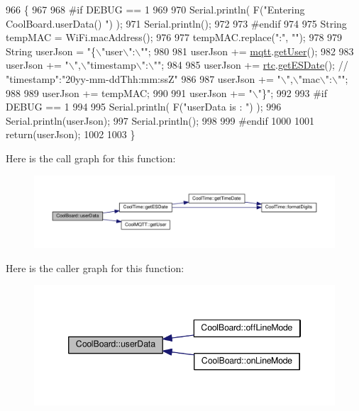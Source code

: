\begin{DoxyCode}
966 \{
967 
968 \textcolor{preprocessor}{#if DEBUG == 1}
969 
970     Serial.println( F(\textcolor{stringliteral}{"Entering CoolBoard.userData() "}) );
971     Serial.println();
972 
973 \textcolor{preprocessor}{#endif}
974 
975     String tempMAC = WiFi.macAddress();
976 
977     tempMAC.replace(\textcolor{stringliteral}{":"}, \textcolor{stringliteral}{""});
978 
979     String userJson = \textcolor{stringliteral}{"\{\(\backslash\)"user\(\backslash\)":\(\backslash\)""};
980 
981     userJson += \hyperlink{classCoolBoard_a2399f44d7c23c1149a335cb3b46d90f1}{mqtt}.\hyperlink{classCoolMQTT_a373cc92fca7760d886f02d8a6e5b3f63}{getUser}();
982 
983     userJson += \textcolor{stringliteral}{"\(\backslash\)",\(\backslash\)"timestamp\(\backslash\)":\(\backslash\)""};
984 
985     userJson += \hyperlink{classCoolBoard_a50d2a6716879d64a85f3c6b44ad63275}{rtc}.\hyperlink{classCoolTime_ac4f32ee513c1328d984306645e8785a4}{getESDate}(); \textcolor{comment}{// "timestamp":"20yy-mm-ddThh:mm:ssZ"}
986 
987     userJson += \textcolor{stringliteral}{"\(\backslash\)",\(\backslash\)"mac\(\backslash\)":\(\backslash\)""};
988 
989     userJson += tempMAC;
990 
991     userJson += \textcolor{stringliteral}{"\(\backslash\)"\}"};
992 
993 \textcolor{preprocessor}{#if DEBUG == 1}
994 
995     Serial.println( F(\textcolor{stringliteral}{"userData is : "}) );
996     Serial.println(userJson);
997     Serial.println();
998 
999 \textcolor{preprocessor}{#endif  }
1000     
1001     \textcolor{keywordflow}{return}(userJson);
1002     
1003 \}
\end{DoxyCode}
Here is the call graph for this function\+:
\nopagebreak
\begin{figure}[H]
\begin{center}
\leavevmode
\includegraphics[width=350pt]{classCoolBoard_ae7358fb6e623cfc81b775f5f1734909b_cgraph}
\end{center}
\end{figure}
Here is the caller graph for this function\+:
\nopagebreak
\begin{figure}[H]
\begin{center}
\leavevmode
\includegraphics[width=346pt]{classCoolBoard_ae7358fb6e623cfc81b775f5f1734909b_icgraph}
\end{center}
\end{figure}



